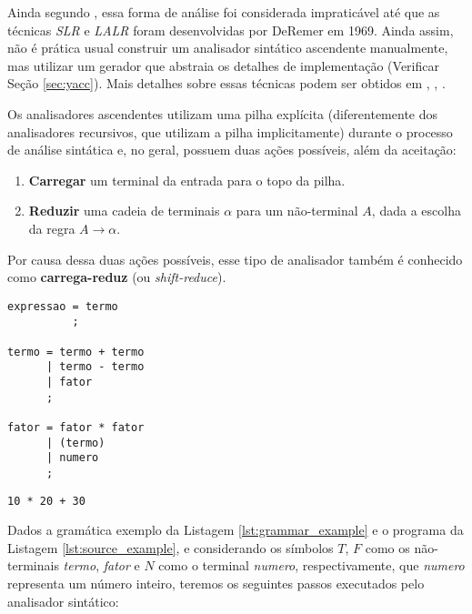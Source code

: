 Ainda segundo , essa forma de análise foi
considerada impraticável até que as técnicas \emph{SLR} e \emph{LALR}
foram desenvolvidas por DeRemer em 1969. Ainda assim, não é prática usual
construir um analisador sintático ascendente manualmente, mas utilizar um
gerador que abstraia os detalhes de implementação (Verificar Seção
\ref{sec:yacc}). Mais detalhes sobre essas técnicas podem ser obtidos em
, , .

Os analisadores ascendentes utilizam uma pilha explícita (diferentemente dos
analisadores recursivos, que utilizam a pilha implicitamente) durante o processo de
análise sintática e, no geral, possuem duas ações possíveis, além da aceitação:

\begin{enumerate}
	\item \textbf{Carregar} um terminal da entrada para o topo da pilha.
	\item \textbf{Reduzir} uma cadeia de terminais $\alpha$ para um não-terminal
	      $A$, dada a escolha da regra $A \rightarrow \alpha$.
\end{enumerate}

Por causa dessa duas ações possíveis, esse tipo de analisador também é
conhecido como \textbf{carrega-reduz} (ou \emph{shift-reduce}).

\begin{lstlisting}[label=lst:grammar_example, caption=Gramática Exemplo]
expressao = termo
          ;

termo = termo + termo
      | termo - termo
      | fator
      ;

fator = fator * fator
      | (termo)
      | numero
      ;
\end{lstlisting}

\begin{lstlisting}[label=lst:source_example, caption=Programa Exemplo]
10 * 20 + 30
\end{lstlisting}

Dados a gramática exemplo da Listagem \ref{lst:grammar_example} e o programa
da Listagem \ref{lst:source_example}, e considerando os símbolos $T$, $F$ como
os não-terminais \emph{termo}, \emph{fator} e $N$ como o terminal \emph{numero},
respectivamente, que \emph{numero} representa um número inteiro, teremos os
seguintes passos executados pelo analisador sintático:

